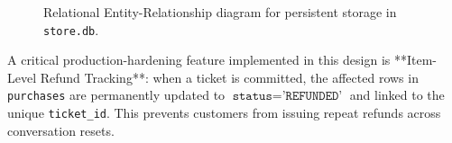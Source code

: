 \begin{figure}[H]
\caption{Relational Entity-Relationship diagram for persistent storage in \texttt{store.db}.}
\label{fig:er_diagram}
\end{figure}

A critical production-hardening feature implemented in this design is **Item-Level Refund Tracking**: when a ticket is committed, the affected rows in \texttt{purchases} are permanently updated to $\texttt{status} = \texttt{'REFUNDED'}$ and linked to the unique \texttt{ticket\_id}. This prevents customers from issuing repeat refunds across conversation resets.

